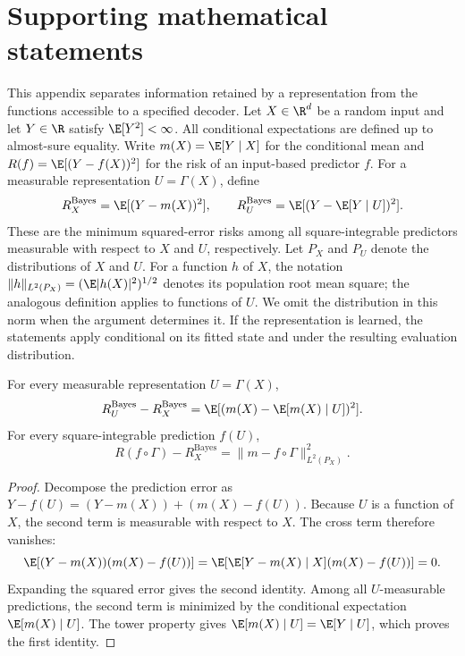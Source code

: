 \section{Supporting mathematical statements}\label{c:app:theory}

This appendix separates information retained by a representation from the
functions accessible to a specified decoder. Let $X\in\R^d$ be a random
input and let $Y\in\R$ satisfy $\E[Y^2]<\infty$. All conditional
expectations are defined up to almost-sure equality. Write
$m(X)=\E[Y\mid X]$ for the conditional mean and
$R(f)=\E[(Y-f(X))^2]$ for the risk of an input-based predictor $f$.
For a measurable representation $U=\Gamma(X)$, define
\[
 R_X^{\mathrm{Bayes}}=\E[(Y-m(X))^2],\qquad
 R_U^{\mathrm{Bayes}}=\E[(Y-\E[Y\mid U])^2].
\]
These are the minimum squared-error risks among all square-integrable
predictors measurable with respect to $X$ and $U$, respectively. Let
$P_X$ and $P_U$ denote the distributions of $X$ and $U$. For a function
$h$ of $X$, the notation
$\|h\|_{L^2(P_X)}=(\E|h(X)|^2)^{1/2}$ denotes its population root mean
square; the analogous definition applies to functions of $U$. We omit
the distribution in this norm when the argument determines it. If the
representation is learned, the statements apply conditional on its fitted
state and under the resulting evaluation distribution.

\begin{proposition}
\label{c:prop:representation-risk}
For every measurable representation $U=\Gamma(X)$,
\[
 R_U^{\mathrm{Bayes}}-R_X^{\mathrm{Bayes}}
 =\E[(m(X)-\E[m(X)\mid U])^2].
\]
For every square-integrable prediction $f(U)$,
\[
 R(f\circ\Gamma)-R_X^{\mathrm{Bayes}}
 =\|m-f\circ\Gamma\|_{L^2(P_X)}^2.
\]
\end{proposition}
\begin{proof}
Decompose the prediction error as
$Y-f(U)=(Y-m(X))+(m(X)-f(U))$. Because $U$ is a function of $X$, the
second term is measurable with respect to $X$. The cross term therefore
vanishes:
\[
 \E[(Y-m(X))(m(X)-f(U))]
 =\E\!\left[\E[Y-m(X)\mid X](m(X)-f(U))\right]=0.
\]
Expanding the squared error gives the second identity. Among all
$U$-measurable predictions, the second term is minimized by the
conditional expectation $\E[m(X)\mid U]$. The tower property gives
$\E[m(X)\mid U]=\E[Y\mid U]$, which proves the first identity.
\end{proof}

